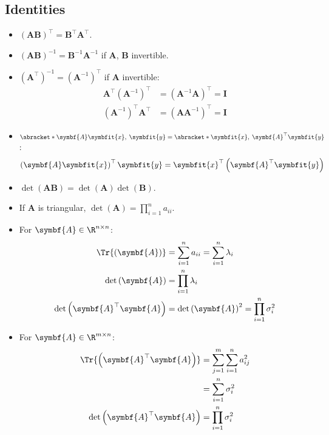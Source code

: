\documentclass{article}
\begin{document}
\begin{multicols*}{3}
    \section{Identities}
    \begin{itemize}
        \item \(\left( \symbf{A} \symbf{B} \right)^\top = \symbf{B}^\top \symbf{A}^\top\).
        \item \(\left( \symbf{A} \symbf{B} \right)^{-1} = \symbf{B}^{-1} \symbf{A}^{-1}\) if \(\symbf{A}\), \(\symbf{B}\) invertible.
        \item \(\left( \symbf{A}^\top \right)^{-1} = \left( \symbf{A}^{-1} \right)^\top\) if \(\symbf{A}\) invertible:
              \begin{align*}
                  \symbf{A}^\top \left( \symbf{A}^{-1} \right)^\top & = \left( \symbf{A}^{-1} \symbf{A} \right)^\top = \symbf{I} \\
                  \left( \symbf{A}^{-1} \right)^\top \symbf{A}^\top & = \left( \symbf{A} \symbf{A}^{-1} \right)^\top = \symbf{I}
              \end{align*}
        \item \(\abracket*{\symbf{A}\symbfit{x},\: \symbfit{y}} = \abracket*{\symbfit{x},\: \symbf{A}^\top \symbfit{y}}\):
              \begin{equation*}
                  \left( \symbf{A} \symbfit{x} \right)^\top \symbfit{y} = \symbfit{x}^\top \left( \symbf{A}^\top \symbfit{y} \right)
              \end{equation*}
        \item \(\det{\left( \symbf{A} \symbf{B} \right)} = \det{\left( \symbf{A} \right)} \det{\left( \symbf{B} \right)}\).
        \item If \(\symbf{A}\) is triangular, \(\det{\left( \symbf{A} \right)} = \prod_{i = 1}^n a_{ii}\).
        \item For \(\symbf{A} \in \R^{n \times n}\):
              \begin{align*}
                  \Tr{\left( \symbf{A} \right)}                 & = \sum_{i = 1}^n a_{ii} = \sum_{i = 1}^n \lambda_i              \\
                  \det{\left( \symbf{A} \right)}                & = \prod_{i = 1}^n \lambda_i                                     \\
                  \det{\left( \symbf{A}^\top \symbf{A} \right)} & = \det{\left( \symbf{A} \right)}^2 = \prod_{i = 1}^n \sigma_i^2
              \end{align*}
        \item For \(\symbf{A} \in \R^{m \times n}\):
              \begin{align*}
                  \Tr{\left( \symbf{A}^\top \symbf{A} \right)}  & = \sum_{j = 1}^m \sum_{i = 1}^n a_{ij}^2 \\
                                                                & = \sum_{i = 1}^n \sigma_i^2              \\
                  \det{\left( \symbf{A}^\top \symbf{A} \right)} & = \prod_{i = 1}^n \sigma_i^2
              \end{align*}
    \end{itemize}
\end{multicols*}
\end{document}
